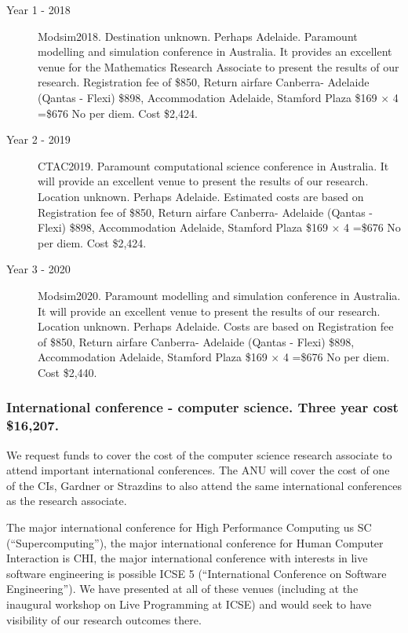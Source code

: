\documentclass[a4paper,twoside,12pt,compact]{article}
\begin{document}
\begin{description}
\item[Year 1 - 2018] Modsim2018. Destination unknown. Perhaps Adelaide.
Paramount modelling and simulation conference in Australia. It provides an excellent venue for the Mathematics Research Associate to present the results of our research. 
Registration fee of \$850, 
Return airfare Canberra- Adelaide (Qantas - Flexi) \$898,
Accommodation Adelaide, Stamford Plaza \$169 $\times$ 4 =\$676
No per diem. Cost \$2,424.



\item[Year 2 - 2019] CTAC2019.
Paramount computational science conference in Australia. It will provide an excellent venue to present the results of our research. Location unknown. Perhaps Adelaide.
Estimated costs are based on 
Registration fee of \$850, 
Return airfare Canberra- Adelaide (Qantas - Flexi) \$898,
Accommodation Adelaide, Stamford Plaza \$169 $\times$ 4 =\$676
No per diem. Cost \$2,424.

\item[Year 3 - 2020] Modsim2020.
Paramount modelling and simulation conference in Australia. It will provide an excellent venue to present the results of our research. Location unknown. Perhaps Adelaide.
Costs are based on 
Registration fee of \$850, 
Return airfare Canberra- Adelaide (Qantas - Flexi) \$898,
Accommodation Adelaide, Stamford Plaza \$169 $\times$ 4 =\$676
No per diem. Cost \$2,440.




\end{description}

\subsubsection*{International conference - computer science. Three year cost \$16,207.}


We request funds to cover the cost of the computer science research associate to attend important international conferences.    
The ANU will cover the cost of one of the CIs, Gardner or Strazdins to also attend the same international conferences as the research associate. 

The major international conference for High Performance Computing us SC (``Supercomputing''), the major international conference for Human Computer Interaction is CHI, the major international conference with interests in live software engineering is possible ICSE 5 (``International Conference on Software Engineering''). We have presented at all of these venues (including at the inaugural workshop on Live Programming at ICSE) and would seek to have visibility of our research outcomes there. 
\end{document}
